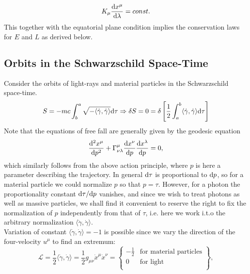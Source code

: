 	\begin{equation}
		K_\mu \frac{\mathrm{d} x^\mu}{\mathrm{d} \lambda} = const.
	\end{equation}
	This together with the equatorial plane condition implies the conservation laws for $E$ and $L$ as derived below.
	
	
	
	
	
	
	
	
	
	
	
	
	
	\subsection{Orbits in the Schwarzschild Space-Time}
	Consider the orbits of light-rays and material particles in the Schwarzschild space-time.
	\begin{equation}
	S = - mc \int^a_b \sqrt{-\langle \dot{\gamma},\dot{\gamma}\rangle} \mathrm{d} \tau \Rightarrow \delta S=0=\delta \left[\frac{1}{2} \int^b_a \langle \dot{\gamma}, \dot{\gamma} \rangle \mathrm{d} \tau \right]
	\end{equation}
	Note that the equations of free fall are generally given by the geodesic equation
	\begin{equation}
	\frac{\mathrm{d}^2 x^\mu}{\mathrm{d} p^2} + \Gamma^\mu_{\nu \lambda} \frac{\mathrm{d} x^\nu}{\mathrm{d} p} \frac{\mathrm{d} x^\lambda}{\mathrm{d} p} = 0,
	\end{equation}
	which similarly follows from the above action principle, where $p$ is here a parameter describing the trajectory. In general $\mathrm{d} \tau$ is proportional to $\mathrm{d} p$, so for a material particle we could normalize $p$ so that $p=\tau$. However, for a photon the proportionality constant $\mathrm{d} \tau/\mathrm{d} p$ vanishes, and since we wish to treat photons as well as massive particles, we shall find it convenient to reserve the right to fix the normalization of $p$ independently from that of $\tau$, i.e. here we work i.t.o the arbitrary normalization $\langle \dot{\gamma},\dot{\gamma}\rangle$.\\
	Variation of constant $\langle \dot{\gamma},\dot{\gamma}\rangle=-1$ is possible since we vary the direction of the four-velocity $u^{\mu}$ to find an extremum:
	\begin{equation}
	\mathcal{L}=\frac{1}{2} \langle \dot{\gamma},\dot{\gamma}\rangle = \frac{1}{2} g_{\mu \nu} \dot{x}^{\mu} \dot{x}^{\nu}= \left\{\begin{array}{lr}
	-\frac{1}{2} & \text{for material particles}\\
	0  & \text{for light}\\
	\end{array}\right\},
	\end{equation}
